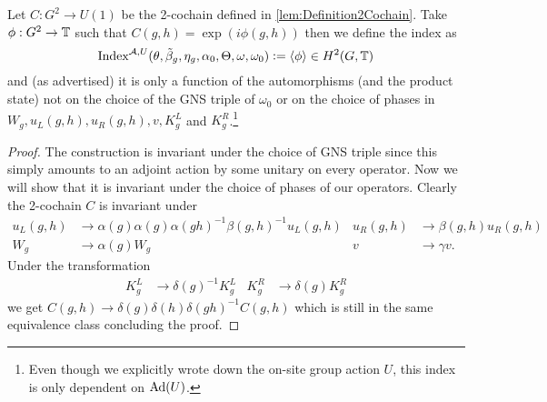\documentclass[11pt,a4paper,twoside]{article}
\numberwithin{equation}{section}
\begin{document}
	\begin{definition}\label{def:DefinitionOfTheH2ValuedIndex}
		Let $C:G^2\rightarrow U(1)$ be the 2-cochain defined in \ref{lem:Definition2Cochain}. Take $\phi:G^2\rightarrow\mathbb T$ such that $C(g,h)=\exp(i\phi(g,h))$ then we define the index as
		\begin{equation}
			\textrm{Index}^{\mathcal A,U}(\theta,\tilde{\beta}_g,\eta_g,\alpha_0,\Theta,\omega,\omega_0)\vcentcolon=\expval{\phi}\in H^2(G,\mathbb T)
		\end{equation}
		and (as advertised) it is only a function of the automorphisms (and the product state) not on the choice of the GNS triple of $\omega_0$ or on the choice of phases in $W_g,u_L(g,h),u_R(g,h),v,K_g^L$ and $K_g^R$.\footnote{Even though we explicitly wrote down the on-site group action $U$, this index is only dependent on $\Ad{U}$.}
	\end{definition}
	\begin{proof}
		The construction is invariant under the choice of GNS triple since this simply amounts to an adjoint action by some unitary on every operator. Now we will show that it is invariant under the choice of phases of our operators. Clearly the 2-cochain $C$ is invariant under
		\begin{align}
			u_L(g,h)&\rightarrow \alpha(g)\alpha(g)\alpha(gh)^{-1}\beta(g,h)^{-1} u_L(g,h)&u_R(g,h)&\rightarrow \beta(g,h)u_R(g,h)\\
			W_g&\rightarrow\alpha(g)W_g&v&\rightarrow \gamma v.
		\end{align}
		Under the transformation
		\begin{align}
			K_g^L&\rightarrow \delta(g)^{-1}K_g^L&K_g^R&\rightarrow \delta(g)K_g^R
		\end{align}
		we get $C(g,h)\rightarrow \delta(g)\delta(h)\delta(gh)^{-1}C(g,h)$ which is still in the same equivalence class concluding the proof.
	\end{proof}
\end{document}
